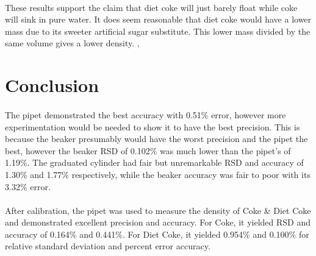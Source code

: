 \documentclass[fleqn,titlepage]{article}
\begin{document}
    \paragraph{} These results support the claim that diet coke will just barely float while coke will sink in pure water. It does seem reasonable that diet coke would have a lower mass due to its sweeter artificial sugar substitute. This lower mass divided by the same volume gives a lower density.
, 
\section*{Conclusion}
  \paragraph{} The pipet demonstrated the best accuracy with 0.51\% error, however more experimentation would be needed to show it to have the best precision. This is because the beaker presumably would have the worst precision and the pipet the best, however the beaker RSD of 0.102\% was much lower than the pipet's of 1.19\%. The graduated cylinder had fair but unremarkable RSD and accuracy of 1.30\% and 1.77\% respectively, while the beaker accuracy was fair to poor with its 3.32\% error. 

  \paragraph{} After calibration, the pipet was used to measure the density of Coke \& Diet Coke and demonstrated excellent precision and accuracy. For Coke, it yielded RSD and accuracy of 0.164\% and 0.441\%. For Diet Coke, it yielded 0.954\% and 0.100\% for relative standard deviation and percent error accuracy.

\end{document}
